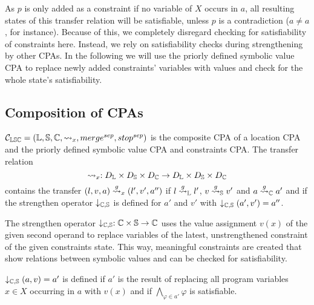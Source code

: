 As $p$ is only added as a constraint if no variable of $X$ occurs in $a$, all resulting states of this transfer relation will be satisfiable, unless $p$ is a contradiction ($a \neq a$, for instance). Because of this, we completely disregard checking for satisfiability of constraints here.
Instead, we rely on satisfiability checks during strengthening by other CPAs.
In the following we will use the priorly defined symbolic value CPA to replace newly added constraints' variables with values and check for the whole state's satisfiability.

\subsection{Composition of CPAs}
$\mathcal{C}_{\mathbb{L}\mathbb{S}\mathbb{C}} = (\mathbb{L}, \mathbb{S}, \mathbb{C}, \rightsquigarrow_x, merge^{sep}, stop^{sep})$ is the composite CPA of a location CPA and the priorly defined symbolic value CPA and constraints CPA.
The transfer relation \[\rightsquigarrow_x : D_{\mathbb{L}} \times D_{\mathbb{S}} \times D_{\mathbb{C}} \rightarrow D_{\mathbb{L}} \times D_{\mathbb{S}} \times D_{\mathbb{C}}\] contains
the transfer $(l, v, a) \overset{g}{\rightsquigarrow}_x (l', v', a'')$ if 
            $l \overset{g}{\rightsquigarrow}_{\mathbb{L}} l'$,
            $v \overset{g}{\rightsquigarrow}_{\mathbb{S}} v'$ and
            $a \overset{g}{\rightsquigarrow}_{\mathbb{C}} a'$ and
            if the strengthen operator $\downarrow_{\mathbb{C}, \mathbb{S}}$ is defined for $a'$ and $v'$ with
            $\downarrow_{\mathbb{C}, \mathbb{S}} (a', v') = a''$.

The strengthen operator $\downarrow_{\mathbb{C}, \mathbb{S}} : \mathbb{C} \times \mathbb{S} \rightarrow \mathbb{C}$ uses the value assignment $v(x)$ of the given second operand to replace variables of the latest, unstrengthened constraint of the given constraints state. This way, meaningful constraints are created that show relations between symbolic values and can be checked for satisfiability.

$\downarrow_{\mathbb{C}, \mathbb{S}} (a, v) = a'$ is defined if $a'$ is the result of replacing all program variables $x \in X$ occurring in $a$ with $v(x)$ and if $\displaystyle\bigwedge_{\varphi \in a'} \varphi$ is satisfiable.

